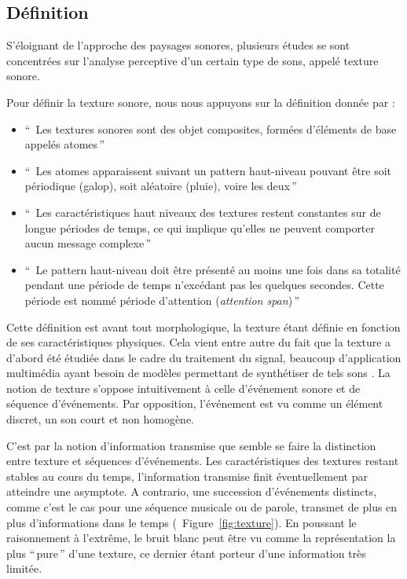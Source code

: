 \subsection{Définition}

S'éloignant de l'approche des paysages sonores, plusieurs études se sont concentrées sur l'analyse perceptive d'un certain type de sons, appelé texture sonore.

Pour définir la texture sonore, nous nous appuyons sur la définition donnée par \citep[p. 25]{saint1995classification}:  

\begin{itemize}
\item ``\, Les textures sonores sont des objet composites, formées d'éléments de base appelés atomes\,''
\item ``\, Les atomes apparaissent suivant un pattern haut-niveau pouvant être soit périodique (galop), soit aléatoire (pluie), voire les deux\,''
\item ``\, Les caractéristiques haut niveaux des textures restent constantes sur de longue périodes de temps, ce qui implique qu'elles ne peuvent comporter aucun message complexe\,''
\item ``\, Le pattern haut-niveau doit être présenté au moins une fois dans sa totalité pendant une période de temps n’excédant pas les quelques  secondes. Cette période est nommé période d'attention (\emph{attention span})\,''
\end{itemize}

Cette définition est avant tout morphologique, la texture étant définie en fonction de ses caractéristiques physiques. Cela vient entre autre du fait que la texture a d'abord été étudiée dans le cadre du traitement du signal, beaucoup d'application multimédia ayant besoin de  modèles permettant de synthétiser de tels sons \citep{schwarz2011state}. La notion de texture s'oppose intuitivement à celle d'événement sonore et de séquence d'événements. Par opposition, l'événement est vu comme un élément discret, un son court et non homogène.

C'est par la notion d'information transmise que semble se faire la distinction entre texture et séquences d'événements. Les caractéristiques des textures restant stables au cours du temps, l'information transmise finit éventuellement par atteindre une asymptote. A contrario, une succession d'événements distincts, comme c'est le cas pour une séquence musicale ou de parole, transmet de plus en plus d'informations dans le temps (\Cf~Figure~\ref{fig:texture}). En poussant le raisonnement à l’extrême, le bruit blanc peut être vu comme la représentation la plus ``\,pure\,'' d'une texture, ce dernier étant porteur d'une information très limitée.

